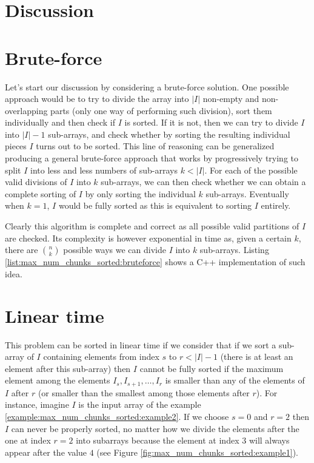\section{Discussion}
\label{max_num_chunks_sorted:sec:discussion}

\section{Brute-force}
\label{max_num_chunks_sorted:sec:bruteforce}


Let's start our discussion by considering a brute-force solution. 
One possible approach would be to try to divide the array into $|I|$ non-empty and non-overlapping parts (only one way of performing such division), 
sort  them individually and then check if $I$ is sorted. 
If it is not, then we can try to divide $I$ into $|I|-1$ sub-arrays,
and check whether by sorting the resulting individual pieces $I$ turns out to be sorted.
This line of reasoning can be generalized producing a general brute-force approach
that works by progressively trying to split $I$ into less and less numbers of sub-arrays $k <|I|$.
For each of the possible valid divisions of $I$ into $k$ sub-arrays, we can then check whether we can obtain a complete sorting of $I$ by only sorting the individual $k$ sub-arrays.
Eventually when $k=1$, $I$ would be fully sorted as this is equivalent to sorting $I$ entirely.

Clearly this algorithm is complete and correct
as all possible valid partitions of $I$ are checked. Its complexity is however exponential
in time as, given a certain $k$,  there are ${n \choose k} $ possible ways we can divide $I$ into $k$ sub-arrays. 
Listing \ref{list:max_num_chunks_sorted:bruteforce} shows a C++ implementation of such idea. 



    



\section{Linear time}
\label{max_num_chunks_sorted:sec:lineartime}
This problem can be sorted in linear time if we consider that if we sort a sub-array of $I$
containing elements from index $s$ to $r< |I|-1$  (there is at least an element after this sub-array) 
then $I$ cannot be fully sorted if the maximum element among the elements $I_s, I_{s+1},\ldots, I_r$
is smaller than any of the elements of $I$ after $r$ (or smaller than the smallest among those elements after $r$). 
For instance, imagine $I$ is the input array of the example \ref{example:max_num_chunks_sorted:example2}. 
If we choose $s=0$ and $r=2$ then $I$ can never be properly sorted, no matter how we divide the elements after the one at index $r=2$ into subarrays
because the element at index $3$ will always appear after the value $4$ (see Figure \ref{fig:max_num_chunks_sorted:example1}).

